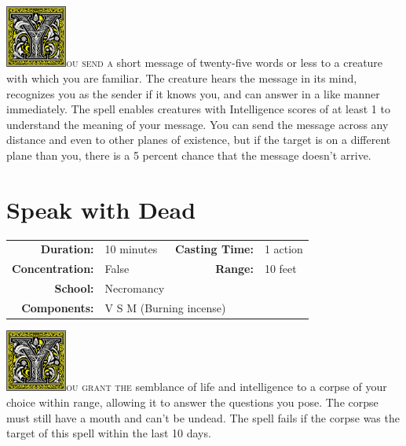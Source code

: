 \documentclass[12pt,showtrims]{memoir}
\begin{document}
\vspace{1\baselineskip}\noindent 
\lettrine[lines=4]{\includegraphics[height=58pt]{initials/Y.png}}{ou send a} short message of twenty-five words or less to a creature with which you are familiar. The creature hears the message in its mind, recognizes you as the sender if it knows you, and can answer in a like manner immediately. The spell enables creatures with Intelligence scores of at least 1 to understand the meaning of your message.
You can send the message across any distance and even to other planes of existence, but if the target is on a different plane than you, there is a 5 percent chance that the message doesn’t arrive.

\newpage
\begin{figure}[p]
\end{figure}
\newpage
\FloatBarrier
\section*{Speak with Dead}
{
\small\centering\vspace{-6pt}
\begin{tabular}{rlrl}
\toprule

\textbf{Duration:} & 10 minutes &
\textbf{Casting Time:} & 1 action \\
\textbf{Concentration:} & False &
\textbf{Range:} & 10 feet \\
\textbf{School:} & Necromancy \\
\textbf{Components:} & \multicolumn{3}{p{0.7\textwidth}}{V S M (Burning incense)}\\

\bottomrule
\end{tabular}
}
\vspace{1\baselineskip}\noindent 
\lettrine[lines=4]{\includegraphics[height=58pt]{initials/Y.png}}{ou grant the} semblance of life and intelligence to a corpse of your choice within range, allowing it to answer the questions you pose. The corpse must still have a mouth and can’t be undead. The spell fails if the corpse was the target of this spell within the last 10 days.
\end{document}
